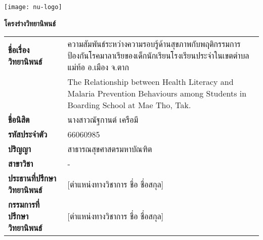 \begin{titlepage}

  \begin{center}
    \texttt{[image: nu-logo]}

    \textbf{โครงร่างวิทยานิพนธ์}
  \end{center}


  \begin{table}[h]
    \centering
    \begin{tabular}{p{4cm} p{11cm}}
      \textbf{ชื่อเรื่องวิทยานิพนธ์}        & ความสัมพันธ์ระหว่างความรอบรู้ด้านสุขภาพกับพฤติกรรมการป้องกันโรคมาลาเรียของเด็กนักเรียนโรงเรียนประจำในเขตตำบลแม่ท้อ อ.เมือง จ.ตาก                    \\

                                     & The Relationship between Health Literacy and Malaria Prevention Behaviours among Students in Boarding School at Mae Tho, Tak. \\

      \textbf{ชื่อนิสิต}                 &
      นางสาวณัฐกานต์ เครือมี                                                                                                                                             \\

      \textbf{รหัสประจำตัว}             & 66060985                                                                                                                      \\

      \textbf{ปริญญา}                 & สาธารณสุขศาสตรมหาบัณฑิต                                                                                                          \\

      \textbf{สาขาวิชา}               & -                                                                                                                             \\

      \textbf{ประธานที่ปรึกษาวิทยานิพนธ์}  & [ตำแหน่งทางวิชาการ ชื่อ ชื่อสกุล]                                                                                                     \\

      \textbf{กรรมการที่ปรึกษาวิทยานิพนธ์} & [ตำแหน่งทางวิชาการ ชื่อ ชื่อสกุล]                                                                                                     \\


\end{tabular}
\end{table}
\end{titlepage}
